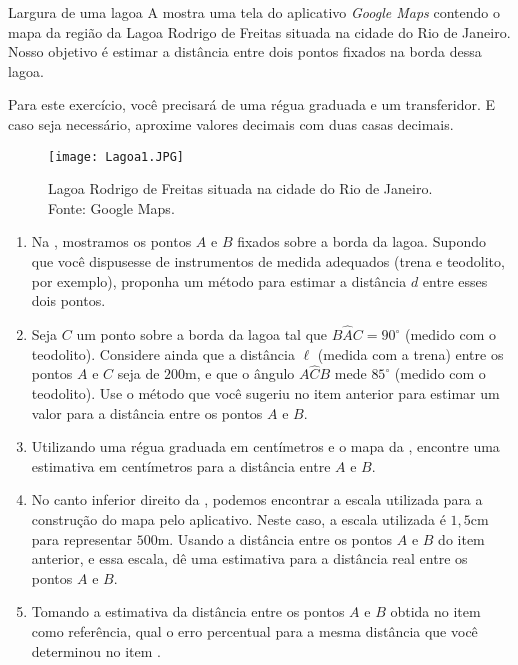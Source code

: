 \begin{task}{Largura de uma lagoa}
A  mostra uma tela do aplicativo {\textit{Google Maps}} contendo o mapa da região da Lagoa Rodrigo de Freitas situada na cidade do Rio de Janeiro. Nosso objetivo é estimar a distância entre dois pontos fixados na borda dessa lagoa.

Para este exercício, você precisará de uma régua graduada e um transferidor. E caso seja necessário, aproxime valores decimais com duas casas decimais.
\begin{figure}[H]
    \centering
    \texttt{[image: Lagoa1.JPG]}
    \caption{Lagoa Rodrigo de Freitas situada na cidade do Rio de Janeiro. Fonte: Google Maps.}
    \label{Lagoa1}
\end{figure}

\begin{enumerate}
\item{}
Na , mostramos os pontos $A$ e $B$ fixados sobre a borda da lagoa. Supondo que você dispusesse de instrumentos de medida adequados (trena e teodolito, por exemplo), proponha um método para estimar a distância $d$ entre esses dois pontos.

\item{}
Seja $C$ um ponto sobre a borda da lagoa tal que $B\hat{A}C=90^\circ$ (medido com o teodolito). Considere ainda que a distância $\ell$ (medida com a trena) entre os pontos $A$ e $C$ seja de $200$m, e que o ângulo $A\hat{C}B$ mede $85^\circ$ (medido com o teodolito). Use o método que você sugeriu no item anterior para estimar um valor para a distância entre os pontos $A$ e $B$.

\item{}
Utilizando uma régua graduada em centímetros e o mapa da , encontre uma estimativa em centímetros para a distância entre $A$ e $B$.

\item{}
No canto inferior direito da , podemos encontrar a escala utilizada para a construção do mapa pelo aplicativo. Neste caso, a escala utilizada é $1,5$cm para representar $500$m. Usando a distância entre os pontos $A$ e $B$ do item anterior, e essa escala, dê uma estimativa para a distância real entre os pontos $A$ e $B$.

\item{}
Tomando a estimativa da distância entre os pontos $A$ e $B$ obtida no item  como referência, qual o erro percentual para a mesma distância que você determinou no item .
\end{enumerate}
\end{task}

